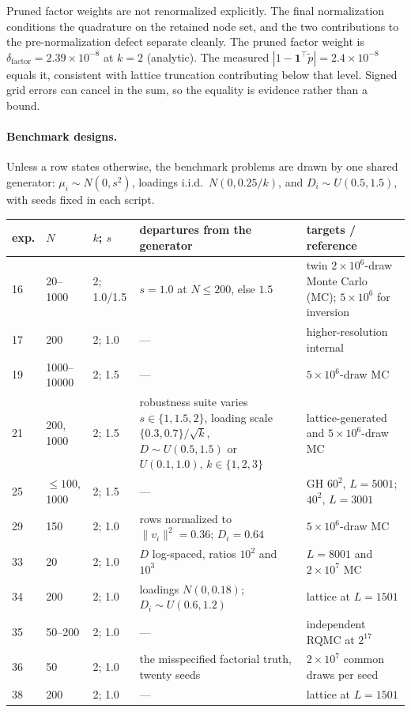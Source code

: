 \documentclass[12pt]{article}
\theoremstyle{remark}
\begin{document}
Pruned factor weights are not renormalized explicitly. The final
normalization conditions the quadrature on the retained node set, and the
two contributions to the pre-normalization defect separate cleanly. The
pruned factor weight is $\delta_{\mathrm{factor}} = 2.39\times10^{-8}$
at $k=2$ (analytic). The measured $|1 - \mathbf{1}^\top \tilde p| =
2.4\times10^{-8}$ equals it, consistent with lattice truncation
contributing below that level. Signed grid errors can cancel in the
sum, so the equality is evidence rather than a bound.

\paragraph{Benchmark designs.} Unless a row states otherwise, the
benchmark problems are drawn by one shared generator: $\mu_i \sim
N(0, s^2)$, loadings i.i.d.\ $N(0, 0.25/k)$, and $D_i \sim
U(0.5, 1.5)$, with seeds fixed in each script.

\begin{center}
\footnotesize
\setlength{\tabcolsep}{4pt}
\renewcommand{\arraystretch}{1.15}
\begin{tabular}{lllp{4.6cm}p{3.4cm}}
\toprule
exp. & $N$ & $k$; $s$ & departures from the generator & targets / reference \\
\midrule
16 & 20--1000 & 2; 1.0/1.5 & $s = 1.0$ at $N \le 200$, else $1.5$ & twin $2{\times}10^6$-draw Monte Carlo (MC); $5{\times}10^6$ for inversion \\
17 & 200 & 2; 1.0 & --- & higher-resolution internal \\
19 & 1000--10000 & 2; 1.5 & --- & $5{\times}10^6$-draw MC \\
21 & 200, 1000 & 2; 1.5 & robustness suite varies $s \in \{1, 1.5, 2\}$, loading scale $\{0.3, 0.7\}/\sqrt{k}$, $D \sim U(0.5,1.5)$ or $U(0.1,1.0)$, $k \in \{1,2,3\}$ & lattice-generated and $5{\times}10^6$-draw MC \\
25 & $\le100$, 1000 & 2; 1.5 & --- & GH $60^2$, $L{=}5001$; $40^2$, $L{=}3001$ \\
29 & 150 & 2; 1.0 & rows normalized to $\|v_i\|^2 = 0.36$; $D_i = 0.64$ & $5{\times}10^6$-draw MC \\
33 & 20 & 2; 1.0 & $D$ log-spaced, ratios $10^2$ and $10^3$ & $L = 8001$ and $2{\times}10^7$ MC \\
34 & 200 & 2; 1.0 & loadings $N(0, 0.18)$; $D_i \sim U(0.6, 1.2)$ & lattice at $L = 1501$ \\
35 & 50--200 & 2; 1.0 & --- & independent RQMC at $2^{17}$ \\
36 & 50 & 2; 1.0 & the misspecified factorial truth, twenty seeds & $2{\times}10^7$ common draws per seed \\
38 & 200 & 2; 1.0 & --- & lattice at $L = 1501$ \\
\bottomrule
\end{tabular}
\end{center}
\end{document}
